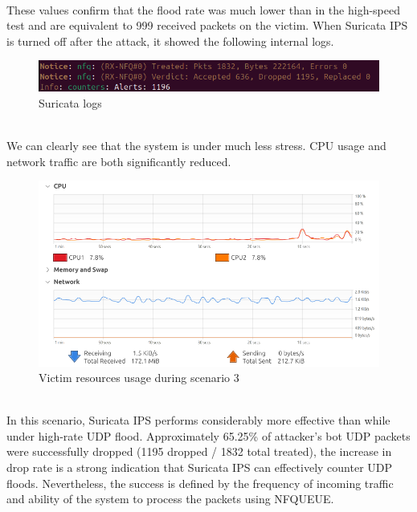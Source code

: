 \\
These values confirm that the flood rate was much lower than in the high-speed test and are equivalent to 999 received packets on the victim. When Suricata IPS is turned off after the attack, it showed the following internal logs.
\pagebreak
\begin{figure}[!htb]
    \centering
    \includegraphics[width=0.8\linewidth]{thesis/s3Suricata.png}
    \caption{Suricata logs}
    \label{fig:enter-label}
\end{figure}
\\
We can clearly see that the system is under much less stress. CPU usage and network traffic are both significantly reduced.
\begin{figure}[!htb]
    \centering
    \includegraphics[width=0.8\linewidth]{thesis/s3Status.png}
    \caption{Victim resources usage during scenario 3}
    \label{fig:enter-label}
\end{figure}
\\
In this scenario, Suricata IPS performs considerably more effective than while under high-rate UDP flood. Approximately 65.25\% of attacker's bot UDP packets were successfully dropped (1195 dropped / 1832 total treated), the increase in drop rate is a strong indication that Suricata IPS can effectively counter UDP floods. Nevertheless, the success is defined by the frequency of incoming traffic and ability of the system to process the packets using NFQUEUE.
\\
